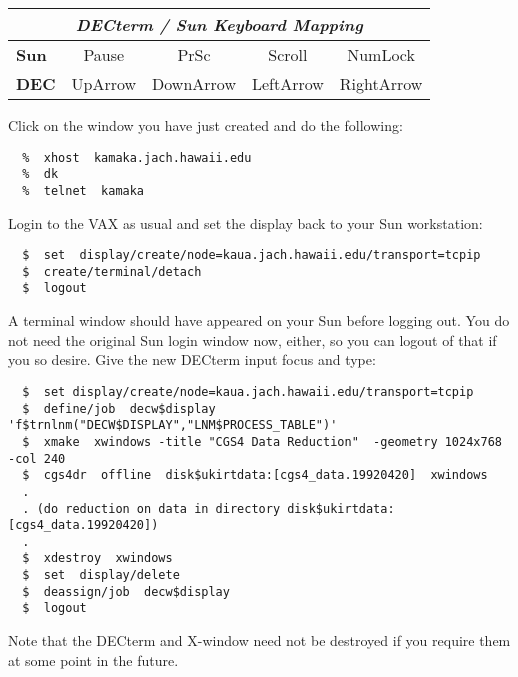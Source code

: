 \begin{center}
\begin{tabular}{|l|c|c|c|c|}
\hline
\multicolumn{5}{|c|}{\sl DECterm / Sun Keyboard Mapping} \\
\hline
{\bf Sun } & {\sf Pause}   & {\sf PrSc}      & {\sf Scroll}    & {\sf NumLock} \\
\hline
{\bf DEC } & {\sf UpArrow} & {\sf DownArrow} & {\sf LeftArrow} & {\sf RightArrow} \\
\hline
\end{tabular}
\end{center}

Click on the window you have just created and do the following:

\begin{verbatim}
  %  xhost  kamaka.jach.hawaii.edu
  %  dk
  %  telnet  kamaka
\end{verbatim}

Login to the VAX as usual and set the display back to your Sun workstation:

\begin{verbatim}
  $  set  display/create/node=kaua.jach.hawaii.edu/transport=tcpip
  $  create/terminal/detach
  $  logout
\end{verbatim}

A terminal window should have appeared on your Sun before logging out. You
do not need the original Sun login window now, either, so you can logout
of that if you so desire. Give the new DECterm input focus and type:

\begin{verbatim}
  $  set display/create/node=kaua.jach.hawaii.edu/transport=tcpip
  $  define/job  decw$display  'f$trnlnm("DECW$DISPLAY","LNM$PROCESS_TABLE")'
  $  xmake  xwindows -title "CGS4 Data Reduction"  -geometry 1024x768 -col 240
  $  cgs4dr  offline  disk$ukirtdata:[cgs4_data.19920420]  xwindows
  .
  . (do reduction on data in directory disk$ukirtdata:[cgs4_data.19920420])
  .
  $  xdestroy  xwindows
  $  set  display/delete
  $  deassign/job  decw$display
  $  logout
\end{verbatim}

Note that the DECterm and X-window need not be destroyed if you require them
at some point in the future.


